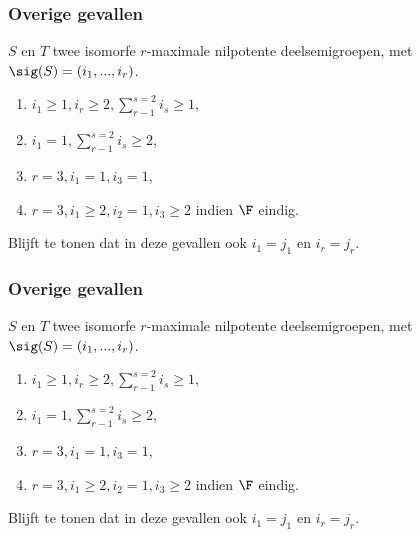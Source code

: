 \begin{frame}
\frametitle{{\color{blurred}Overige gevallen}}

\begin{block}{}
{\color{lightgray}$S$ en $T$ twee isomorfe $r$-maximale nilpotente deelsemigroepen, met $\sig(S) = (i_1, ...,i_r)$.}

\begin{enumerate}[-]
\item {\color{lightgray}$i_1 \geq 1, i_r \geq 2, \sum_{r-1}^{s=2} i_s \geq 1 $,}
\item {\color{lightgray}$i_1 = 1, \sum_{r-1}^{s=2} i_s \geq 2 $,}
\item {\color{lightgray}$r=3, i_1 = 1, i_3 = 1 $,}
\item {\color{lightgray}$r=3, i_1 \geq 2, i_2 = 1, i_3 \geq 2 $ indien $\F$ eindig.}
\end{enumerate}

\end{block}

\begin{block}{}
{\color{lightgray}Blijft te tonen dat in deze gevallen ook $i_1 = j_1$ en $i_r = j_r$.}
\end{block}

\end{frame}


\begin{frame}
\frametitle{{\color{blurred}Overige gevallen}}

\begin{block}{}
{\color{lightgray}$S$ en $T$ twee isomorfe $r$-maximale nilpotente deelsemigroepen, met $\sig(S) = (i_1, ...,i_r)$.}

\begin{enumerate}[-]
\item {\color{lightgray}$i_1 \geq 1, i_r \geq 2, \sum_{r-1}^{s=2} i_s \geq 1 $,}
\item {\color{lightgray}$i_1 = 1, \sum_{r-1}^{s=2} i_s \geq 2 $,}
\item {\color{lightgray}$r=3, i_1 = 1, i_3 = 1 $,}
\item {\color{lightgray}$r=3, i_1 \geq 2, i_2 = 1, i_3 \geq 2 $ indien $\F$ eindig.}
\end{enumerate}

\end{block}

\begin{block}{}
{\color{lightgray}Blijft te tonen dat in deze gevallen ook $i_1 = j_1$ en $i_r = j_r$.}
\end{block}

\end{frame}
